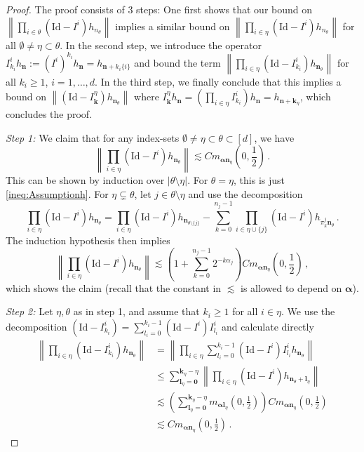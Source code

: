 \documentclass[11pt,oneside,english,reqno]{amsart}
\numberwithin{equation}{section}
\numberwithin{figure}{section}
\theoremstyle{plain}
\theoremstyle{definition}
\theoremstyle{remark}
\theoremstyle{plain}
\theoremstyle{plain}
\theoremstyle{plain}
\theoremstyle{plain}
\theoremstyle{plain}
\newcommand{\bk}{\mathbf{k}}
\newcommand{\bl}{\mathbf l}
\newcommand{\bn}{\mathbf{n}}
\newcommand{\boo}{\mathbf{0}}
\newcommand{\balpha}{{\boldsymbol\alpha}}
\newcommand{\Id}{\mathrm{Id}}
\newcommand{\norm}[1]{\left\lVert #1\right\rVert}
\newcommand{\abs}[1]{\left\lvert #1\right\rvert}
\begin{document}
\begin{proof}
    The proof consists of 3 steps: One first shows that our bound on $\norm{\prod_{i\in\theta}(\Id-I^i)h_{n_\theta}}$ implies a similar bound on $\norm{\prod_{i\in\eta}(\Id-I^i)h_{n_\theta}}$ for all $\emptyset\neq\eta\subset\theta$. In the second step, we introduce the operator $I^i_{k_i}h_\bn := (I^i)^{k_i}h_\bn = h_{\bn+k_i\{i\}}$ and bound the term $\norm{\prod_{i\in\eta}(\Id- I^i_{k_i})h_{\bn_\theta}}$ for all $k_i\ge 1$, $i=1,\dots, d$. In the third step, we finally conclude that this implies a bound on $\norm{(\Id-I^\eta_\bk)h_{\bn_\theta}}$ where $I^\eta_\bk h_\bn = \left(\prod_{i\in\eta}I^i_{k_i}\right)h_\bn = h_{\bn+\bk_\eta}$, which concludes the proof.

\bigskip

    \noindent \emph{Step 1:} We claim that for any index-sets $\emptyset\neq\eta\subset\theta\subset[d]$, we have
%
    \begin{equation*}
        \norm{\prod_{i\in\eta}(\Id-I^i)h_{\bn_\theta}}\lesssim Cm_{\balpha\bn_\eta}\left(0,\frac 12\right)\,.
    \end{equation*}
%
    This can be shown by induction over $\abs{\theta\setminus\eta}$. For $\theta = \eta$, this is just \eqref{ineq:Assumptionh}. For $\eta\subsetneq\theta$, let $j\in\theta\setminus\eta$ and use the decomposition
%
    \begin{equation*}
        \prod_{i\in\eta}(\Id-I^i)h_{\bn_\theta} = \prod_{i\in\eta}(\Id-I^i)h_{\bn_{\theta\setminus\{j\}}} - \sum_{k=0}^{n_j-1}\prod_{i\in\eta\cup\{j\}}(\Id-I^i)h_{{\pi^j_k\bn_\theta}}\,.
    \end{equation*}
%
    The induction hypothesis  then implies
%
    \begin{equation*}
        \norm{\prod_{i\in\eta}(\Id-I^i)h_{\bn_\theta}}\lesssim \left(1+\sum_{k=0}^{n_j-1}2^{-k\alpha_j}\right)Cm_{\balpha\bn_\eta}\left(0,\frac 12\right)\,,
    \end{equation*}
%
    which shows the claim (recall that the constant in $\lesssim$ is allowed to depend on $\balpha$). 

\bigskip

    \noindent\emph{Step 2:} Let $\eta,\theta$ as in step 1, and assume that $k_i\ge 1$ for all $i\in\eta$. We use the decomposition $(\Id-I^i_{k_i}) = \sum_{l_i = 0}^{k_i-1}(\Id-I^i)I^i_{l_i}$ and calculate directly
%
    \begin{align}
        \norm{\prod_{i\in\eta} (\Id-I^i_{k_i})h_{\bn_\theta}} &= \norm{\prod_{i\in\eta} \sum_{l_i = 0}^{k_i-1}(\Id-I^i)I^i_{l_i}h_{\bn_\theta}}\nonumber\\
        &\le \sum_{\bl_\eta=\boo}^{\bk_\eta-\eta}\norm{\prod_{i\in\eta}(\Id-I^i)h_{\bn_\theta+\bl_\eta}}\nonumber\\
        &\lesssim \left(\sum_{\bl_\eta = \boo}^{\bk_\eta-\eta}m_{\balpha\bl_\eta}\left(0,\frac 12\right)\right) Cm_{\balpha\bn_\eta}\left(0,\frac12\right)\\
        &\lesssim  Cm_{\balpha\bn_\eta}\left(0,\frac12\right)\,.\label{ineq:prodKI}
    \end{align}


\end{proof}
\end{document}
